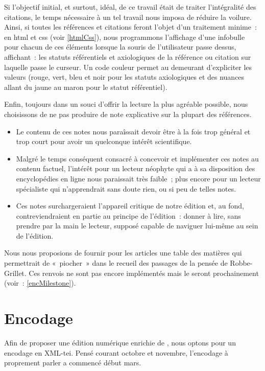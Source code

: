Si l'objectif initial, et surtout, idéal, de ce travail était de traiter l'intégralité des citations, le temps nécessaire à un tel travail nous imposa de réduire la voilure.
Ainsi, si toutes les références et citations feront l'objet d'un traitement minime~: en html et css (voir \ref{htmlCss}), nous programmons l'affichage d'une infobulle pour chacun de ces éléments lorsque la souris de l'utilisateur passe dessus, affichant~: les statuts référentiels et axiologiques de la référence ou citation sur laquelle passe le curseur. Un code couleur permet au demeurant d'expliciter les valeurs (rouge, vert, bleu et noir pour les statuts axiologiques et des nuances allant du jaune au maron pour le statut référentiel).


Enfin, toujours dans un souci d'offrir la lecture la plus agréable possible, nous choisissons de ne pas produire de note explicative sur la plupart des références.
\begin{itemize}
    \item Le contenu de ces notes nous paraîssait devoir être à la fois trop général et trop court pour avoir un quelconque intérêt scientifique.
    \item Malgré le temps conséquent consacré à concevoir et implémenter ces notes au contenu factuel, l'intérêt pour un lecteur néophyte qui a à sa disposition des encyclopédies en ligne nous paraissait très faible~; plus encore pour un lecteur spécialiste qui n'apprendrait sans doute rien, ou si peu de telles notes.
    \item Ces notes surchargeraient l'appareil critique de notre édition et, au fond, contreviendraient en partie au principe de l'édition~: donner à lire, sans prendre par la main le lecteur, supposé capable de naviguer lui-même au sein de l'édition.
\end{itemize}





Nous nous proposions de fournir pour les articles une table des matières qui permettrait de «~piocher~» dans le recueil des passages de la pensée de Robbe-Grillet. Ces renvois ne sont pas encore implémentés mais le seront prochainement (voir~: \ref{encMilestone}).


\section{Encodage}
Afin de proposer une édition numérique enrichie de \punr, nous optons pour un encodage en XML-tei. Pensé courant octobre et novembre, l'encodage à proprement parler a commencé début mars.
